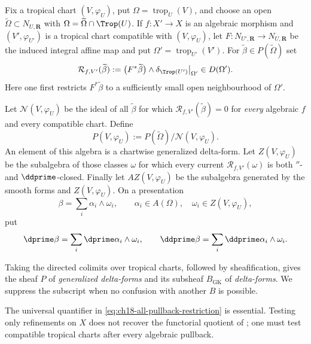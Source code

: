 \begin{definition}
\label{def:ch18-global-pb}
Fix a tropical chart $(V,\varphi_U)$, put
$\Omega=\operatorname{trop}_U(V)$, and choose an open
$\widetilde\Omega\subset N_{U,\mathbf R}$ with
$\Omega=\widetilde\Omega\cap\Trop(U)$.  If
$f:X'\to X$ is an algebraic morphism and $(V',\varphi_{U'})$ is a tropical
chart compatible with $(V,\varphi_U)$, let
$F:N_{U',\mathbf R}\to N_{U,\mathbf R}$ be the induced integral affine map
and put $\Omega'=\operatorname{trop}_{U'}(V')$.  For
$\widetilde\beta\in P(\widetilde\Omega)$ set
\begin{equation}
\label{eq:ch18-all-pullback-restriction}
 \mathcal R_{f,V'}(\widetilde\beta)
 :=\bigl(F^*\widetilde\beta\bigr)\wedge
      \delta_{\Trop(U')}\big|_{\Omega'}\in D(\Omega').
\end{equation}
Here one first restricts $F^*\widetilde\beta$ to a sufficiently small open
neighbourhood of $\Omega'$.

Let $\mathcal N(V,\varphi_U)$ be the ideal of all
$\widetilde\beta$ for which
$\mathcal R_{f,V'}(\widetilde\beta)=0$ for \emph{every} algebraic $f$ and
every compatible chart.  Define
\[
 P(V,\varphi_U):=P(\widetilde\Omega)/\mathcal N(V,\varphi_U).
\]
An element of this algebra is a chartwise generalized delta-form.  Let
$Z(V,\varphi_U)$ be the subalgebra of those classes $\omega$ for which every
current $\mathcal R_{f,V'}(\omega)$ is both $\dprime$- and
$\ddprime$-closed.  Finally let $AZ(V,\varphi_U)$ be the subalgebra generated
by the smooth forms and $Z(V,\varphi_U)$.  On a presentation
\begin{equation}
\label{eq:ch18-az-presentation}
                 \beta=\sum_i\alpha_i\wedge\omega_i,
 \qquad \alpha_i\in A(\Omega),\quad
        \omega_i\in Z(V,\varphi_U),
\end{equation}
put
\[
 \dprime\beta=\sum_i\dprime\alpha_i\wedge\omega_i,
 \qquad
 \ddprime\beta=\sum_i\ddprime\alpha_i\wedge\omega_i.
\]

Taking the directed colimits over tropical charts, followed by
sheafification, gives the sheaf $P$ of \emph{generalized delta-forms} and
its subsheaf $B_{\mathrm{GK}}$ of \emph{delta-forms}.  We suppress the
subscript when no confusion with another $B$ is possible.
\end{definition}

The universal quantifier in
\eqref{eq:ch18-all-pullback-restriction} is essential.  Testing only
refinements on $X$ does not recover the functorial quotient of
\cite[Definition~4.4]{GK17}; one must test compatible tropical charts after
every algebraic pullback.

